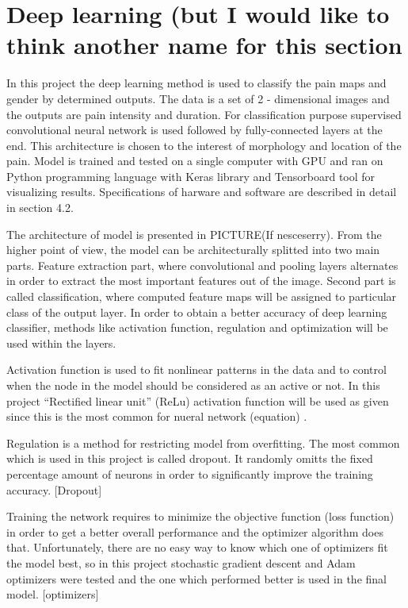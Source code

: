 \section{Deep learning (but I would like to think another name for this section}
In this project the deep learning method is used to classify the pain maps and gender by determined outputs. The data is a set of 2 - dimensional images and the outputs are pain intensity and duration. For classification purpose supervised convolutional neural network is used followed by fully-connected layers at the end. This architecture is chosen to the interest of morphology and location of the pain. Model is trained and tested on a single computer with GPU and ran on Python programming language with Keras library and Tensorboard tool for visualizing results. Specifications of harware and software are described in detail in section 4.2.

\noindent
The architecture of model is presented in PICTURE(If nesceserry). From the higher point of view, the model can be architecturally splitted into two main parts. Feature extraction part, where convolutional and pooling layers alternates in order to extract the most important features out of the image. Second part is called classification, where computed feature maps will be assigned to particular class of the output layer. In order to obtain a better accuracy of deep learning classifier, methods like activation function, regulation and optimization will be used within the layers.

\noindent
Activation function is used to fit nonlinear patterns in the data and to control when the node in the model should be considered as an active or not.  In this project “Rectified linear unit” (ReLu) activation function will be used as given since this is the most common for nueral network (equation)  \citep{Goodfellow2016}.

\noindent
Regulation is a method for restricting model from overfitting. The most common which is used in this project is called dropout. It randomly omitts the fixed percentage amount of neurons in order to significantly improve the training accuracy. [Dropout]

\noindent
Training the network requires to minimize the objective function (loss function) in order to get a better overall performance and the optimizer algorithm does that. Unfortunately, there are no easy way to know which one of optimizers fit the model best, so in this project stochastic gradient descent and Adam optimizers were tested and the one which performed better is used in the final model. [optimizers]

